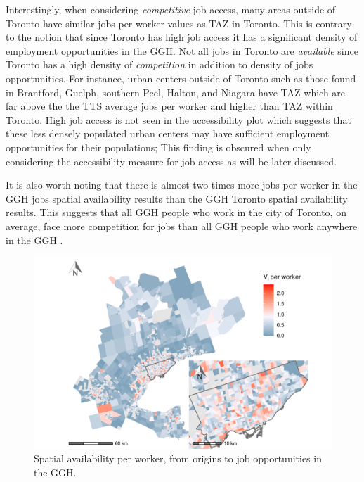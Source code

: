 \documentclass[]{elsarticle} %
\begin{document}
Interestingly, when considering \emph{competitive} job access, many
areas outside of Toronto have similar jobs per worker values as TAZ in
Toronto. This is contrary to the notion that since Toronto has high job
access it has a significant density of employment opportunities in the
GGH. Not all jobs in Toronto are \emph{available} since Toronto has a
high density of \emph{competition} in addition to density of jobs
opportunities. For instance, urban centers outside of Toronto such as
those found in Brantford, Guelph, southern Peel, Halton, and Niagara
have TAZ which are far above the the TTS average jobs per worker and
higher than TAZ within Toronto. High job access is not seen in the
accessibility plot which suggests that these less densely populated
urban centers may have sufficient employment opportunities for their
populations; This finding is obscured when only considering the
accessibility measure for job access as will be later discussed.

It is also worth noting that there is almost two times more jobs per
worker in the GGH jobs spatial availability results than the GGH Toronto
spatial availability results. This suggests that all GGH people who work
in the city of Toronto, on average, face more competition for jobs than
all GGH people who work anywhere in the GGH .

\begin{figure}
\includegraphics[width=1\linewidth]{Spatial-Availability_files/figure-latex/plot-avail-GGH-TTS-per-worker-1} \caption{\label{fig:plot-avail-GGH-TTS-per-worker}Spatial availability per worker, from origins to job opportunities in the GGH.}\label{fig:plot-avail-GGH-TTS-per-worker}
\end{figure}
\end{document}
